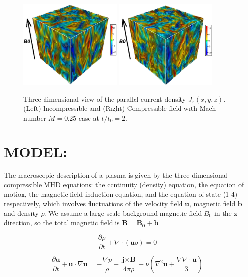 \documentclass[%
aip,pop,amsmath,amssymb,
 reprint,%
]{revtex4-1}
\begin{document}
\begin{figure}[<t>]
\begin{center}
{\includegraphics[width = 0.45\textwidth]{./Figures/Fig1_a}}
{\includegraphics[width = 0.45\textwidth]{./Figures/Fig1_b}}
\caption{Three dimensional view of the parallel current density $J_z(x,y,z)$. (Left) Incompressible and 
(Right) Compressible field with Mach number $M=0.25$ case at $t/t_0 =2$.}
\end{center}
\end{figure}


\section{\label{sec:level2}MODEL:}
The macroscopic description of a plasma is given by the three-dimensional compressible MHD equations: the continuity (density) equation, the equation of motion, the magnetic field induction equation, and the equation of state (1-4) respectively, which involves fluctuations  of the velocity field $\textbf{u}$, magnetic field $\textbf{b}$ and density $\rho$. We assume a large-scale background magnetic field $B_0$ in the z-direction, so the total magnetic field is $\mathbf{B = B_0 + b}$


\begin{equation}
 \frac{\partial \rho}{\partial t} + \nabla \cdot (\textbf{u}\rho) = 0
\end{equation}

\begin{equation}
 \frac{\partial \textbf{u}}{\partial t} + \textbf{u} \cdot \nabla \textbf{u} = - \frac{\nabla p}{\rho} + \frac{\textbf{j} \times \textbf{B}}{4\pi\rho} 
 + \nu \left( \nabla^2 \textbf{u} +    \frac{\nabla \nabla \cdot \textbf{u} }{3} \right)
\end{equation}
\end{document}
